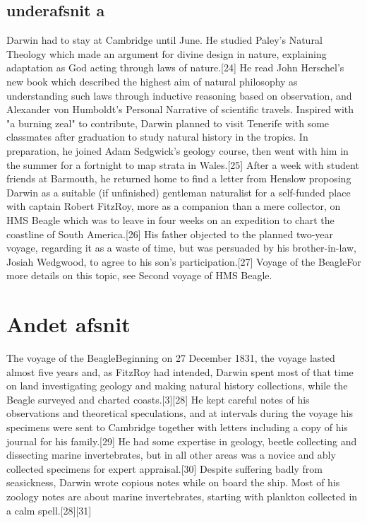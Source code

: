 \documentclass{article}%
\begin{document}
\subsection{underafsnit a}
Darwin had to stay at Cambridge until June. He studied Paley's Natural Theology which made an argument for divine design in nature, explaining adaptation as God acting through laws of nature.[24] He read John Herschel's new book which described the highest aim of natural philosophy as understanding such laws through inductive reasoning based on observation, and Alexander von Humboldt's Personal Narrative of scientific travels. Inspired with "a burning zeal" to contribute, Darwin planned to visit Tenerife with some classmates after graduation to study natural history in the tropics.
In preparation, he joined Adam Sedgwick's geology course, then went with him in the summer for a fortnight to map strata in Wales.[25] After a week with student friends at Barmouth, he returned home to find a letter from Henslow proposing Darwin as a suitable (if unfinished) gentleman naturalist for a self-funded place with captain Robert FitzRoy, more as a companion than a mere collector, on HMS Beagle which was to leave in four weeks on an expedition to chart the coastline of South America.[26] His father objected to the planned two-year voyage, regarding it as a waste of time, but was persuaded by his brother-in-law, Josiah Wedgwood, to agree to his son's participation.[27]
Voyage of the BeagleFor more details on this topic, see Second voyage of HMS Beagle.

\section{Andet afsnit}
The voyage of the BeagleBeginning on 27 December 1831, the voyage lasted almost five years and, as FitzRoy had intended, Darwin spent most of that time on land investigating geology and making natural history collections, while the Beagle surveyed and charted coasts.[3][28] He kept careful notes of his observations and theoretical speculations, and at intervals during the voyage his specimens were sent to Cambridge together with letters including a copy of his journal for his family.[29] He had some expertise in geology, beetle collecting and dissecting marine invertebrates, but in all other areas was a novice and ably collected specimens for expert appraisal.[30] Despite suffering badly from seasickness, Darwin wrote copious notes while on board the ship. Most of his zoology notes are about marine invertebrates, starting with plankton collected in a calm spell.[28][31]
\end{document}
